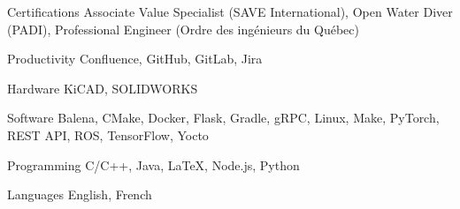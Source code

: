 \begin{cvskills}

  \cvskill
  {Certifications}
  {
    Associate Value Specialist (SAVE International),
    Open Water Diver (PADI),
    Professional Engineer (Ordre des ingénieurs du Québec)
  }

  \cvskill
  {Productivity}
  {
    Confluence,
    GitHub,
    GitLab,
    Jira
  }

  \cvskill
  {Hardware}
  {
    KiCAD,
    SOLIDWORKS
  }

  \cvskill
  {Software}
  {
    Balena,
    CMake,
    Docker,
    Flask,
    Gradle,
    gRPC,
    Linux,
    Make,
    PyTorch,
    REST API,
    ROS,
    TensorFlow,
    Yocto
  }

  \cvskill
  {Programming}
  {
    C/C++,
    Java,
    LaTeX,
    Node.js,
    Python
  }

  \cvskill
  {Languages}
  {
    English,
    French
  }

\end{cvskills}
